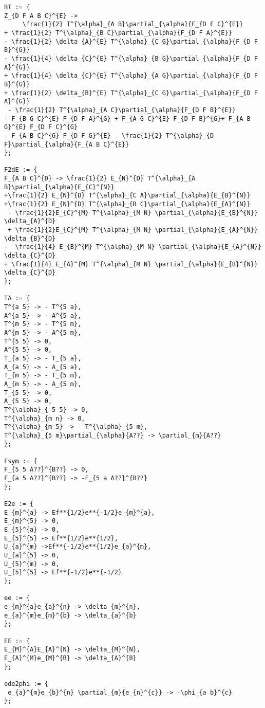 \documentclass[11pt]{article}
\begin{document}
{\color[named]{Blue}\begin{verbatim}
BI := {
Z_{D F A B C}^{E} -> 
     \frac{1}{2} T^{\alpha}_{A B}\partial_{\alpha}{F_{D F C}^{E}} 
+ \frac{1}{2} T^{\alpha}_{B C}\partial_{\alpha}{F_{D F A}^{E}} 
- \frac{1}{2} \delta_{A}^{E} T^{\alpha}_{C G}\partial_{\alpha}{F_{D F B}^{G}}
- \frac{1}{4} \delta_{C}^{E} T^{\alpha}_{B G}\partial_{\alpha}{F_{D F A}^{G}} 
+ \frac{1}{4} \delta_{C}^{E} T^{\alpha}_{A G}\partial_{\alpha}{F_{D F B}^{G}} 
+ \frac{1}{2} \delta_{B}^{E} T^{\alpha}_{C G}\partial_{\alpha}{F_{D F A}^{G}} 
 - \frac{1}{2} T^{\alpha}_{A C}\partial_{\alpha}{F_{D F B}^{E}} 
- F_{B G C}^{E} F_{D F A}^{G} + F_{A G C}^{E} F_{D F B}^{G}+ F_{A B G}^{E} F_{D F C}^{G} 
- F_{A B C}^{G} F_{D F G}^{E} - \frac{1}{2} T^{\alpha}_{D F}\partial_{\alpha}{F_{A B C}^{E}}
};

F2dE := {
F_{A B C}^{D} -> \frac{1}{2} E_{N}^{D} T^{\alpha}_{A B}\partial_{\alpha}{E_{C}^{N}}
+\frac{1}{2} E_{N}^{D} T^{\alpha}_{C A}\partial_{\alpha}{E_{B}^{N}}
+\frac{1}{2} E_{N}^{D} T^{\alpha}_{B C}\partial_{\alpha}{E_{A}^{N}}
 - \frac{1}{2}E_{C}^{M} T^{\alpha}_{M N} \partial_{\alpha}{E_{B}^{N}} \delta_{A}^{D}
 + \frac{1}{2}E_{C}^{M} T^{\alpha}_{M N} \partial_{\alpha}{E_{A}^{N}} \delta_{B}^{D}
-  \frac{1}{4} E_{B}^{M} T^{\alpha}_{M N} \partial_{\alpha}{E_{A}^{N}} \delta_{C}^{D}
+ \frac{1}{4} E_{A}^{M} T^{\alpha}_{M N} \partial_{\alpha}{E_{B}^{N}} \delta_{C}^{D}
};

TA := {
T^{a 5} -> - T^{5 a},
A^{a 5} -> - A^{5 a},
T^{m 5} -> - T^{5 m},
A^{m 5} -> - A^{5 m},
T^{5 5} -> 0,
A^{5 5} -> 0,
T_{a 5} -> - T_{5 a},
A_{a 5} -> - A_{5 a},
T_{m 5} -> - T_{5 m},
A_{m 5} -> - A_{5 m},
T_{5 5} -> 0,
A_{5 5} -> 0,
T^{\alpha}_{ 5 5} -> 0,
T^{\alpha}_{m n} -> 0,
T^{\alpha}_{m 5} -> - T^{\alpha}_{5 m},
T^{\alpha}_{5 m}\partial_{\alpha}{A??} -> \partial_{m}{A??}
};

Fsym := {
F_{5 5 A??}^{B??} -> 0,
F_{a 5 A??}^{B??} -> -F_{5 a A??}^{B??}
};

E2e := {
E_{m}^{a} -> Ef**{1/2}e**{-1/2}e_{m}^{a},
E_{m}^{5} -> 0,
E_{5}^{a} -> 0,
E_{5}^{5} -> Ef**{1/2}e**{1/2},
U_{a}^{m} ->Ef**{-1/2}e**{1/2}e_{a}^{m},
U_{a}^{5} -> 0,
U_{5}^{m} -> 0,
U_{5}^{5} -> Ef**{-1/2}e**{-1/2}
};

ee := {
e_{m}^{a}e_{a}^{n} -> \delta_{m}^{n},
e_{a}^{m}e_{m}^{b} -> \delta_{a}^{b}
};

EE := {
E_{M}^{A}E_{A}^{N} -> \delta_{M}^{N},
E_{A}^{M}e_{M}^{B} -> \delta_{A}^{B}
};

ede2phi := {
 e_{a}^{m}e_{b}^{n} \partial_{m}{e_{n}^{c}} -> -\phi_{a b}^{c}
};


\end{verbatim}}
\end{document}
